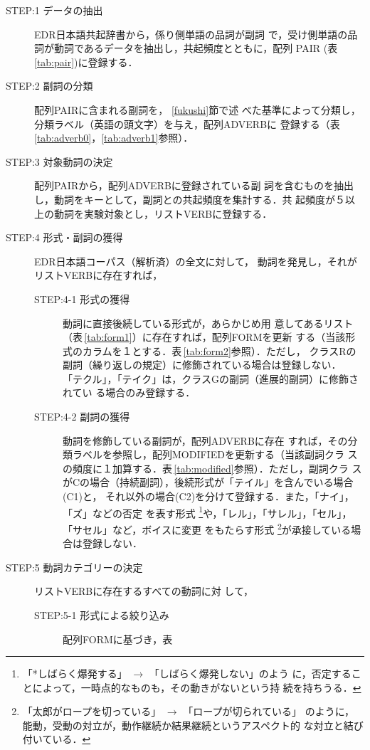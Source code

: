 \begin{description}
\item[STEP:1 データの抽出] EDR日本語共起辞書から，係り側単語の品詞が副詞
  で，受け側単語の品詞が動詞であるデータを抽出し，共起頻度とともに，配列
  PAIR (表\,\ref{tab:pair})に登録する．
\item[STEP:2 副詞の分類] 配列PAIRに含まれる副詞を， \ref{fukushi}節で述
  べた基準によって分類し，分類ラベル（英語の頭文字）を与え，配列ADVERBに
  登録する（表\,\ref{tab:adverb0}，\ref{tab:adverb1}参照）．
\item[STEP:3 対象動詞の決定] 配列PAIRから，配列ADVERBに登録されている副
  詞を含むものを抽出し，動詞をキーとして，副詞との共起頻度を集計する．共
  起頻度が５以上の動詞を実験対象とし，リストVERBに登録する．
\item[STEP:4 形式・副詞の獲得] EDR日本語コーパス（解析済）の全文に対して，
  動詞を発見し，それがリストVERBに存在すれば，
  \begin{description}
  \item[STEP:4-1 形式の獲得] 動詞に直接後続している形式が，あらかじめ用
    意してあるリスト（表\,\ref{tab:form1}）に存在すれば，配列FORMを更新
    する（当該形式のカラムを１とする．表\,\ref{tab:form2}参照）．ただし，
    クラスRの副詞（繰り返しの規定）に修飾されている場合は登録しない．
    「テクル」，「テイク」は，クラスGの副詞（進展的副詞）に修飾されてい
    る場合のみ登録する．
  \item[STEP:4-2 副詞の獲得] 動詞を修飾している副詞が，配列ADVERBに存在
    すれば，その分類ラベルを参照し，配列MODIFIEDを更新する（当該副詞クラ
    スの頻度に１加算する．表\,\ref{tab:modified}参照）．ただし，副詞クラ
    スがCの場合（持続副詞），後続形式が「テイル」を含んでいる場合(C1)と，
    それ以外の場合(C2)を分けて登録する．また，「ナイ」，「ズ」などの否定
    を表す形式
    \footnote{
      「*しばらく爆発する」 $\rightarrow$ 「しばらく爆発しない」のよう
      に，否定することによって，一時点的なものも，その動きがないという持
      続を持ちうる．
      }や，「レル」，「サレル」，「セル」，「サセル」など，ボイスに変更
    をもたらす形式
    \footnote{
      「太郎がロープを切っている」 $\rightarrow$ 「ロープが切られている」
      のように，能動，受動の対立が，動作継続か結果継続というアスペクト的
      な対立と結び付いている．
      }が承接している場合は登録しない．
  \end{description}
\item[STEP:5 動詞カテゴリーの決定] リストVERBに存在するすべての動詞に対
  して，
  \begin{description}
  \item[STEP:5-1 形式による絞り込み] 配列FORMに基づき，表

\end{description}
\end{description}
